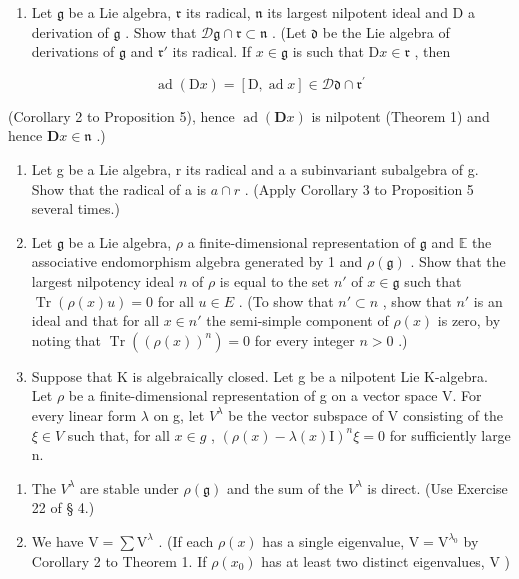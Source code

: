 \begin{enumerate}
\def\labelenumi{\arabic{enumi}.}
\setcounter{enumi}{8}
\tightlist
\item
  Let \(\mathfrak{g}\) be a Lie algebra, \(\mathfrak{r}\) its radical, \(\mathfrak{n}\) its largest nilpotent ideal and D a derivation of \(\mathfrak{g}\) . Show that \(\mathcal{D}\mathfrak{g} \cap \mathfrak{r} \subset \mathfrak{n}\) . (Let \(\mathfrak{d}\) be the Lie algebra of derivations of \(\mathfrak{g}\) and \(\mathfrak{r}'\) its radical. If \(x \in \mathfrak{g}\) is such that \(\mathrm{D}x \in \mathfrak{r}\) , then
\end{enumerate}

\[
\operatorname{ad} (\mathrm{D} x) = [ \mathrm{D}, \operatorname{ad} x ] \in \mathscr {D} \mathfrak {d} \cap \mathfrak {r} ^ {\prime}
\]

(Corollary 2 to Proposition 5), hence \(\operatorname{ad}(\mathbf{D}x)\) is nilpotent (Theorem 1) and hence \(\mathbf{D}x \in \mathfrak{n}\) .)

\begin{enumerate}
\def\labelenumi{\arabic{enumi}.}
\setcounter{enumi}{9}
\item
  Let g be a Lie algebra, r its radical and a a subinvariant subalgebra of g. Show that the radical of a is \(a \cap r\) . (Apply Corollary 3 to Proposition 5 several times.)
\item
  Let \(\mathfrak{g}\) be a Lie algebra, \(\rho\) a finite-dimensional representation of \(\mathfrak{g}\) and \(\mathbb{E}\) the associative endomorphism algebra generated by 1 and \(\rho(\mathfrak{g})\) . Show that the largest nilpotency ideal \(n\) of \(\rho\) is equal to the set \(n'\) of \(x \in \mathfrak{g}\) such that \(\operatorname{Tr}(\rho(x)u) = 0\) for all \(u \in E\) . (To show that \(n' \subset n\) , show that \(n'\) is an ideal and that for all \(x \in n'\) the semi-simple component of \(\rho(x)\) is zero, by noting that \(\operatorname{Tr}((\rho(x))^n) = 0\) for every integer \(n > 0\) .)
\item
  Suppose that K is algebraically closed. Let g be a nilpotent Lie K-algebra. Let \(\rho\) be a finite-dimensional representation of g on a vector space V. For every linear form \(\lambda\) on g, let \(V^{\lambda}\) be the vector subspace of V consisting of the \(\xi \in V\) such that, for all \(x \in g\) , \((\rho(x) - \lambda(x)\mathrm{I})^{n}\xi = 0\) for sufficiently large n.
\end{enumerate}

\begin{enumerate}
\def\labelenumi{(\alph{enumi})}
\item
  The \(V^{\lambda}\) are stable under \(\rho(\mathfrak{g})\) and the sum of the \(V^{\lambda}\) is direct. (Use Exercise 22 of § 4.)
\item
  We have \(\mathrm{V} = \sum \mathrm{V}^{\lambda}\) . (If each \(\rho(x)\) has a single eigenvalue, \(\mathrm{V} = \mathrm{V}^{\lambda_0}\) by Corollary 2 to Theorem 1. If \(\rho(x_0)\) has at least two distinct eigenvalues, \(\mathrm{V}\) )
\end{enumerate}


